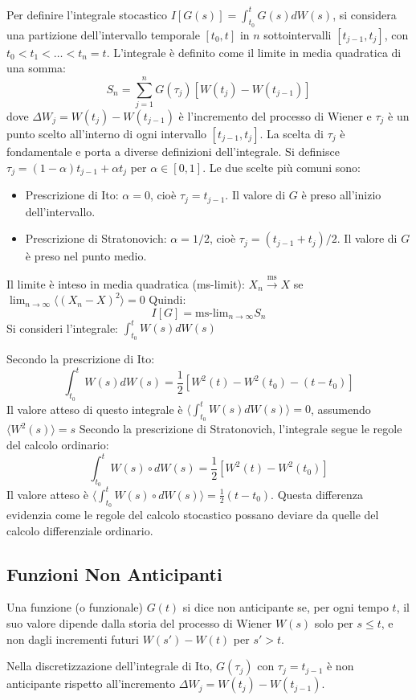 Per definire l'integrale stocastico $I[G(s)] = \int_{t_0}^{t} G(s)dW(s)$, si considera una partizione dell'intervallo temporale $[t_0, t]$ in $n$ sottointervalli $[t_{j-1}, t_j]$, con $t_0 < t_1 < \dots < t_n = t$.
L'integrale è definito come il limite in media quadratica di una somma:
\begin{equation}
S_n = \sum_{j=1}^{n} G(\tau_j)[W(t_j) - W(t_{j-1})]
\end{equation}
dove $\Delta W_j = W(t_j) - W(t_{j-1})$ è l'incremento del processo di Wiener e $\tau_j$ è un punto scelto all'interno di ogni intervallo $[t_{j-1}, t_j]$.
La scelta di $\tau_j$ è fondamentale e porta a diverse definizioni dell'integrale.
Si definisce $\tau_j = (1-\alpha)t_{j-1} + \alpha t_j$ per $\alpha \in [0,1]$.
Le due scelte più comuni sono:

\begin{itemize}
    \item Prescrizione di Ito: $\alpha=0$, cioè $\tau_j = t_{j-1}$. Il valore di $G$ è preso all'inizio dell'intervallo.
    \item Prescrizione di Stratonovich: $\alpha=1/2$, cioè $\tau_j = (t_{j-1}+t_j)/2$. Il valore di $G$ è preso nel punto medio.
\end{itemize}
Il limite è inteso in media quadratica (ms-limit):
$X_n \xrightarrow{\text{ms}} X$   se   $\lim_{n\rightarrow\infty} \langle (X_n - X)^2 \rangle = 0$
Quindi:
\begin{equation}
I[G] = \text{ms-lim}_{n\rightarrow\infty} S_n
\end{equation}
Si consideri l'integrale: $\int_{t_0}^{t} W(s)dW(s)$

Secondo la prescrizione di Ito:
\begin{equation}
\int_{t_0}^{t} W(s)dW(s) = \frac{1}{2}[W^2(t) - W^2(t_0) - (t-t_0)]
\end{equation}
Il valore atteso di questo integrale è $\langle \int_{t_0}^{t} W(s)dW(s) \rangle = 0$, assumendo $\langle W^2(s) \rangle = s$
Secondo la prescrizione di Stratonovich, l'integrale segue le regole del calcolo ordinario:
\begin{equation}
\int_{t_0}^{t} W(s) \circ dW(s) = \frac{1}{2}[W^2(t) - W^2(t_0)]
\end{equation}
Il valore atteso è $\langle \int_{t_0}^{t} W(s) \circ dW(s) \rangle = \frac{1}{2}(t-t_0)$.
Questa differenza evidenzia come le regole del calcolo stocastico possano deviare da quelle del calcolo differenziale ordinario.

\subsection{Funzioni Non Anticipanti}
\begin{tcolorbox}[colback=colorA!5,colframe=colorA, title=Definizione]
Una funzione (o funzionale) $G(t)$ si dice non anticipante se, per ogni tempo $t$, il suo valore dipende dalla storia del processo di Wiener $W(s)$ solo per $s \le t$, e non dagli incrementi futuri $W(s')-W(t)$ per $s' > t$.
\end{tcolorbox}
Nella discretizzazione dell'integrale di Ito, $G(\tau_j)$ con $\tau_j=t_{j-1}$ è non anticipante rispetto all'incremento $\Delta W_j = W(t_j)-W(t_{j-1})$.

